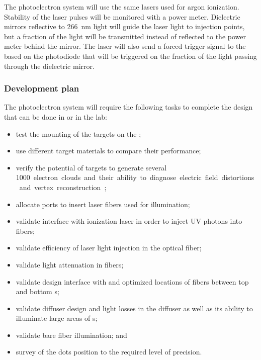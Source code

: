 The photoelectron system will use the same lasers used for argon ionization. Stability of the laser pulses will be monitored  with  a power meter. Dielectric mirrors reflective to \SI{266}{\nano\m} light will guide the laser light to injection points, but a fraction of the light will be transmitted instead of reflected to the power meter behind the mirror. The laser will also send a forced trigger signal to the  based on the photodiode that will be triggered on the fraction of the light passing through the dielectric mirror. 

\subsubsection{Development plan}
The photoelectron system will require the following tasks to complete the design that can be done in  or in the lab: 
\begin{itemize}
    \item test the mounting of the targets on the ;
    \item use different target materials to compare their performance;
    \item verify the potential of targets to generate several \SI{1000} electron clouds and their %
    ability to diagnose electric field distortions and vertex reconstruction;
    \item allocate ports to insert laser fibers used for illumination;
    \item validate interface with %
    ionization laser in order to inject UV photons into fibers;
    \item validate efficiency of laser light injection in the optical fiber;
    \item validate light attenuation in fibers;
    \item validate design interface with  and optimized locations of fibers between top and bottom s;  
    \item validate diffuser design and light losses in the diffuser as well as its ability to illuminate large areas of s;
    \item validate bare fiber  illumination; and 
    \item survey of the dots position to the required level of precision. %

\end{itemize}

